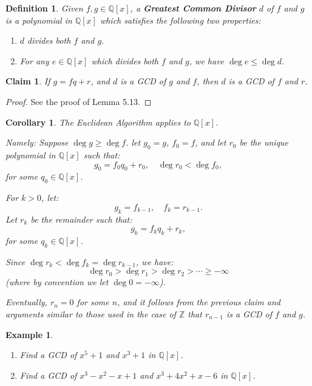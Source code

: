 \documentclass[a4paper,12pt]{report}
\newcounter{statement}
\numberwithin{statement}{chapter}
\newtheorem{defn}[statement]{Definition}
\newtheorem{claim}[statement]{Claim}
\newtheorem{cor}[statement]{Corollary}
\newtheorem{eg}[statement]{\bf Example}
\numberwithin{equation}{chapter}
\numberwithin{section}{chapter}
\numberwithin{subsection}{section}
\begin{document}
\begin{defn}
Given $f, g \in \mathbb{Q}[x]$, a  {\bf  Greatest Common Divisor}  $d$ of $f$ and $g$
is a polynomial in $\mathbb{Q}[x]$ which satisfies the following two properties:
\begin{enumerate}
\item 
$d$ divides both $f$ and $g$.

\item 
For any $e \in \mathbb{Q}[x]$ which divides both $f$ and $g$, we have $\deg e \leq \deg d$.
\end{enumerate}
\end{defn}



\begin{claim}

If $g = fq +r$, and $d$ is a GCD of $g$ and $f$, then $d$ is a GCD of $f$ and $r$.
\end{claim}
\begin{proof}

See the proof of Lemma 5.13.

\end{proof}

\begin{cor}
The Euclidean Algorithm applies to $\mathbb{Q}[x]$.




Namely:  Suppose $\deg g \geq \deg f$.
let $g_0 = g$, $f_0 = f$, and let $r_0$ be the unique polynomial in $\mathbb{Q}[x]$
such that:
\[
g_0 = f_0q_0 + r_0,\quad \deg r_0 < \deg f_0,
\]
for some $q_0 \in \mathbb{Q}[x]$.




For $k > 0$,
let:
\[
g_k = f_{k-1}, \quad f_k = r_{k - 1}.
\]
Let $r_k$ be the remainder such that:
\[
g_k = f_k q_k + r_k,
\]
for some $q_k \in \mathbb{Q}[x]$.




Since $\deg r_k < \deg f_k = \deg r_{k - 1}$,
we have:
\[
\deg r_0 > \deg r_1 > \deg r_2 > \cdots \geq -\infty
\]
(where by convention we let $\deg 0 = -\infty$).




Eventually, $r_n = 0$ for some $n$,
and it follows from the previous claim
and arguments similar to those used in the case of $\mathbb{Z}$
that $r_{n-1}$ is a GCD of $f$ and $g$.

\end{cor}
\begin{eg}

\begin{enumerate}
\item 
Find a GCD of $x^5 + 1$ and $x^3 + 1$ in $\mathbb{Q}[x]$.

\item 
Find a GCD of $x^3 - x^2 - x + 1$ and $x^3 + 4x^2 + x - 6$ in $\mathbb{Q}[x]$.
\end{enumerate}
\end{eg}
\end{document}
